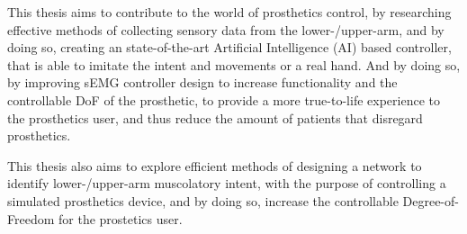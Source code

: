 \documentclass[../main.tex]{subfiles}
\begin{document}
This thesis aims to contribute to the world of prosthetics control, by researching effective methods of collecting sensory data from the lower-/upper-arm, and by doing so, creating an state-of-the-art Artificial Intelligence (AI) based controller, that is able to imitate the intent and movements or a real hand.
And by doing so, by improving sEMG controller design to increase functionality and the controllable DoF of the prosthetic, to provide a more true-to-life experience to the prosthetics user, and thus reduce the amount of patients that disregard prosthetics.

This thesis also aims to explore efficient methods of designing a network to identify lower-/upper-arm muscolatory intent, with the purpose of controlling a simulated prosthetics device, and by doing so, increase the controllable Degree-of-Freedom for the prostetics user.
\end{document}
